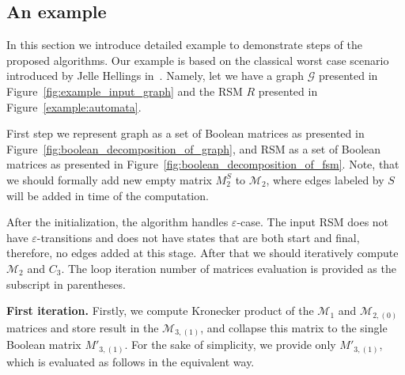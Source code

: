 \subsection{An example}

In this section we introduce detailed example to demonstrate steps of the 
proposed algorithms. Our example is based on the classical worst case scenario 
introduced by Jelle Hellings in~\cite{hellingsPathQuerying}. Namely, let we have 
a graph $\mathcal{G}$ presented in Figure~\ref{fig:example_input_graph} and the 
RSM $R$ presented in Figure~\ref{example:automata}.

First step we represent graph as a set of Boolean matrices as presented in 
Figure~\ref{fig:boolean_decomposition_of_graph}, and RSM as a set of Boolean 
matrices as presented in Figure~\ref{fig:boolean_decomposition_of_fsm}.
Note, that we should formally add new empty matrix $M_2^{S}$ to $\mathcal{M}_2$, 
where edges labeled by $S$ will be added in time of the computation. 

After the initialization, the algorithm handles $\varepsilon$-case.
The input RSM does not have $\varepsilon$-transitions and does not have states
that are both start and final, therefore, no edges added at this stage. 
After that we should iteratively compute $\mathcal{M}_2$ and $C_3$.
The loop iteration number of matrices evaluation is provided as 
the subscript in parentheses.

\textbf{First iteration.} Firstly, we compute Kronecker product of the
$\mathcal{M}_1$ and $\mathcal{M}_{2,(0)}$ matrices and store result in the
$\mathcal{M}_{3,(1)}$, and collapse this matrix to the single Boolean matrix
$M'_{3,(1)}$. For the sake of simplicity, we provide only
$M'_{3,(1)}$, which is evaluated as follows in the equivalent way.

